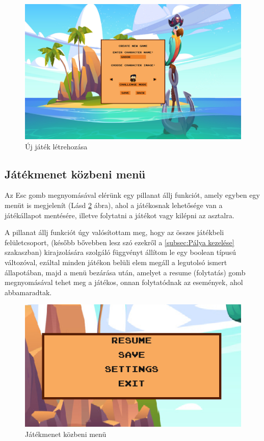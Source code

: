 \begin{figure}[H]
    \centering
    \includegraphics[width=14.0truecm]{images/newgame.png}
    \caption{Új játék létrehozása}
    \label{fig:Új játék létrehozása}
\end{figure}

\subsection{Játékmenet közbeni menü}
 Az Esc gomb megnyomásával elérünk egy pillanat állj funkciót, amely egyben egy menüt is megjelenít (Lásd \ref{fig:Játékmenet közbeni menü} ábra), ahol a játékosnak lehetősége van a játékállapot mentésére, illetve folytatni a játékot vagy kilépni az asztalra.

A pillanat állj funkciót úgy valósítottam meg, hogy az összes játékbeli felületcsoport, (később bővebben lesz szó ezekről a \ref{subsec:Pálya kezelése} szakaszban) kirajzolására szolgáló függvényt állítom le egy boolean típusú változóval, ezáltal minden játékon belüli elem megáll a legutolsó ismert állapotában, majd a menü bezárása után, amelyet a resume (folytatás) gomb megnyomásával tehet meg a játékos, onnan folytatódnak az események, ahol abbamaradtak.


\begin{figure}[H]
    \centering
    \includegraphics[width=12.0truecm]{images/ingamemenu.png}
    \caption{Játékmenet közbeni menü}
    \label{fig:Játékmenet közbeni menü}
\end{figure}

